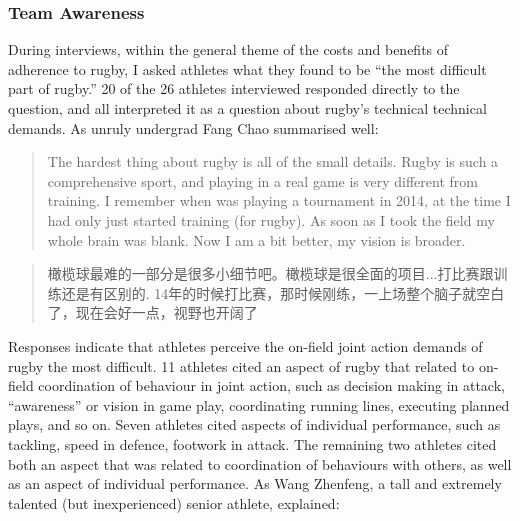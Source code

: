 \begin{CJK}{UTF8}{gbsn}


\subsubsection{Team Awareness}
During interviews, within the general theme of the costs and benefits of adherence to rugby, I asked athletes what they found to be ``the most difficult part of rugby.''  20 of the 26 athletes interviewed responded directly to the question, and all interpreted it as a question about rugby's technical technical demands.  As unruly undergrad Fang Chao summarised well:

\begin{quotation}
  The hardest thing about rugby is all of the small details. Rugby is such a comprehensive sport, and playing in a real game is very different from training. I remember when was playing a tournament in 2014, at the time I had only just started training (for rugby).  As soon as I took the field my whole brain was blank.  Now I am a bit better, my vision is broader.
\end{quotation}

\begin{quotation}
  橄榄球最难的一部分是很多小细节吧。橄榄球是很全面的项目...打比赛跟训练还是有区别的. 14年的时候打比赛，那时候刚练，一上场整个脑子就空白了，现在会好一点，视野也开阔了
\end{quotation}

Responses indicate that athletes perceive the on-field joint action demands of rugby the most difficult. 11 athletes cited an aspect of rugby that related to on-field coordination of behaviour in joint action, such as decision making in attack, ``awareness'' or vision in game play, coordinating running lines, executing planned plays, and so on.  Seven athletes cited aspects of individual performance, such as tackling, speed in defence, footwork in attack. The remaining two athletes cited both an aspect that was related to coordination of behaviours with others, as well as an aspect of individual performance.
As Wang Zhenfeng, a tall and extremely talented (but inexperienced) senior athlete, explained:


\end{CJK}
